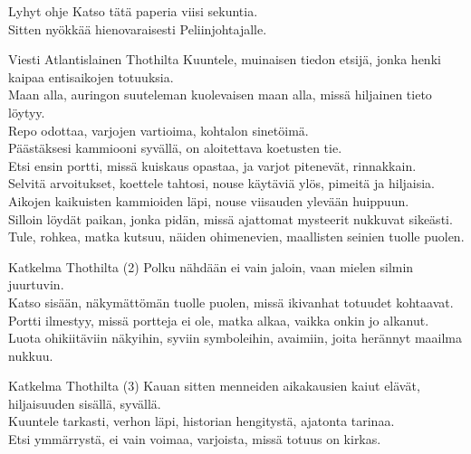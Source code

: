 \documentclass[a4paper,12pt]{article}
\begin{document}
\begin{biginfobox}{Lyhyt ohje}
Katso tätä paperia viisi sekuntia. \\
Sitten nyökkää hienovaraisesti Peliinjohtajalle.
\end{biginfobox}

\begin{biginfobox}{Viesti Atlantislainen Thothilta}
Kuuntele, muinaisen tiedon etsijä, jonka henki kaipaa entisaikojen totuuksia.\\
Maan alla, auringon suuteleman kuolevaisen maan alla, missä hiljainen tieto löytyy.\\
Repo odottaa, varjojen vartioima, kohtalon sinetöimä.\\
Päästäksesi kammiooni syvällä, on aloitettava koetusten tie.\\
Etsi ensin portti, missä kuiskaus opastaa, ja varjot pitenevät, rinnakkain.\\
Selvitä arvoitukset, koettele tahtosi, nouse käytäviä ylös, pimeitä ja hiljaisia.\\
Aikojen kaikuisten kammioiden läpi, nouse viisauden ylevään huippuun.\\
Silloin löydät paikan, jonka pidän, missä ajattomat mysteerit nukkuvat sikeästi.\\
Tule, rohkea, matka kutsuu, näiden ohimenevien, maallisten seinien tuolle puolen.
\end{biginfobox}

\begin{biginfobox}{Katkelma Thothilta (2)}
Polku nähdään ei vain jaloin, vaan mielen silmin juurtuvin.\\
Katso sisään, näkymättömän tuolle puolen, missä ikivanhat totuudet kohtaavat.\\
Portti ilmestyy, missä portteja ei ole, matka alkaa, vaikka onkin jo alkanut.\\
Luota ohikiitäviin näkyihin, syviin symboleihin, avaimiin, joita herännyt maailma nukkuu.
\end{biginfobox}

\begin{biginfobox}{Katkelma Thothilta (3)}
Kauan sitten menneiden aikakausien kaiut elävät, hiljaisuuden sisällä, syvällä.\\
Kuuntele tarkasti, verhon läpi, historian hengitystä, ajatonta tarinaa.\\
Etsi ymmärrystä, ei vain voimaa, varjoista, missä totuus on kirkas.
\end{biginfobox}
\end{document}
